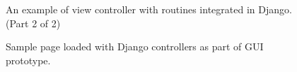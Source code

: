 \begin{figure}[H]
	\centering
	\caption{An example of view controller with routines integrated in Django. (Part 2 of 2)}
	\label{fig:dvc_2}
\end{figure}
\begin{figure}[H]
	\centering
	\caption{Sample page loaded with Django controllers as part of GUI prototype.}
	\label{fig:dvg}
\end{figure}

